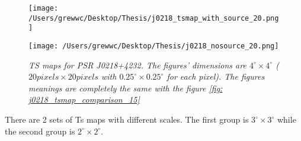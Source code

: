 \documentclass[12pt]{report}
\newcommand{\mycaption}[1]{\caption{\textit{\footnotesize #1}}}
\newcommand{\blackhref}[2]{
  \href{#1}{\color{black}{\textit{\small #2}}}
}
\begin{document}
            \begin{figure}[!ht]
              \begin{center}
              \begin{minipage}{0.45\textwidth}
                \begin{center} 
                  \texttt{[image: /Users/grewwc/Desktop/Thesis/j0218\_tsmap\_with\_source\_20.png]}
                \end{center}
              \end{minipage}
              \begin{minipage}{0.45\textwidth}
                \begin{center}
                  \texttt{[image: /Users/grewwc/Desktop/Thesis/j0218\_nosource\_20.png]}
                \end{center}
              \end{minipage}
            \end{center}

              \centering
              \begin{minipage}{\textwidth}
                \mycaption{TS maps for PSR J0218+4232. The figures' dimensions are $4^{\circ} \times4^{\circ}$ ($20 pixels \times 
                20 pixels$ with $0.25^{\circ} \times 0.25^{\circ}$ for each pixel). The figures meanings 
                are completely the same with the figure \ref{fig: j0218_tsmap_comparison_15}}
                \label{fig: j0218_tsmap_comparison_20}
              \end{minipage}
            \end{figure}

            There are 2 sets of Ts maps with different scales. The first group is $3^{\circ} 
            \times3^{\circ}$ while the second group is $2^{\circ} \times2^{\circ}$. 

\end{document}
